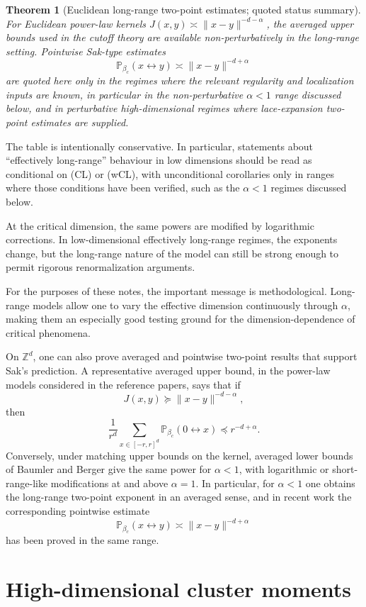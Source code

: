 \documentclass[11pt,reqno]{book}
\numberwithin{equation}{chapter}
\theoremstyle{plain}
\newtheorem{theorem}{Theorem}[chapter]
\theoremstyle{definition}
\theoremstyle{remark}
\renewcommand{\P}{\mathbb P}
\newcommand{\Z}{\mathbb Z}
\newcommand{\1}{\mathbf 1}
\newcommand{\norm}[1]{\lVert #1\rVert}
\newcommand{\pre}{\preceq}
\newcommand{\suc}{\succeq}
\begin{document}
\begin{theorem}[Euclidean long-range two-point estimates; quoted status summary]
For Euclidean power-law kernels \(J(x,y)\asymp\norm{x-y}^{-d-\alpha}\),
the averaged upper bounds used in the cutoff theory are available
non-perturbatively in the long-range setting. Pointwise Sak-type estimates
\[
  \P_{\beta_c}(x\leftrightarrow y)\asymp \norm{x-y}^{-d+\alpha}
\]
are quoted here only in the regimes where the relevant regularity and
localization inputs are known, in particular in the non-perturbative
\(\alpha<1\) range discussed below, and in perturbative high-dimensional
regimes where lace-expansion two-point estimates are supplied.
\end{theorem}
The table is intentionally conservative. In particular, statements about ``effectively long-range'' behaviour in low dimensions should be read as conditional on (CL) or (wCL), with unconditional corollaries only in ranges where those conditions have been verified, such as the \(\alpha<1\) regimes discussed below.

At the critical dimension, the same powers are modified by logarithmic corrections. In low-dimensional effectively long-range regimes, the exponents change, but the long-range nature of the model can still be strong enough to permit rigorous renormalization arguments.

For the purposes of these notes, the important message is methodological. Long-range models allow one to vary the effective dimension continuously through $\alpha$, making them an especially good testing ground for the dimension-dependence of critical phenomena.

On $\Z^d$, one can also prove averaged and pointwise two-point results that support Sak's prediction. A representative averaged upper bound, in the power-law models considered in the reference papers, says that if
\[
  J(x,y)\suc \norm{x-y}^{-d-\alpha},
\]
then
\[
  \frac1{r^d}\sum_{x\in[-r,r]^d}
  \mathbb P_{\beta_c}(0\leftrightarrow x)
  \pre r^{-d+\alpha}.
\]
Conversely, under matching upper bounds on the kernel, averaged lower bounds of Baumler and Berger give the same power for $\alpha<1$, with logarithmic or short-range-like modifications at and above $\alpha=1$. In particular, for $\alpha<1$ one obtains the long-range two-point exponent in an averaged sense, and in recent work the corresponding pointwise estimate
\[
  \mathbb P_{\beta_c}(x\leftrightarrow y)
  \asymp \norm{x-y}^{-d+\alpha}
\]
has been proved in the same range.

\section{High-dimensional cluster moments}
\end{document}
